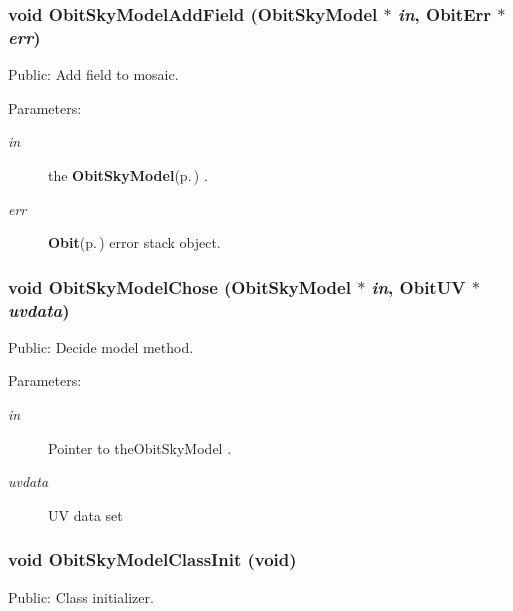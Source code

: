 \subsubsection{\setlength{\rightskip}{0pt plus 5cm}void Obit\-Sky\-Model\-Add\-Field ({\bf Obit\-Sky\-Model} $\ast$ {\em in}, {\bf Obit\-Err} $\ast$ {\em err})}\label{ObitSkyModel_8h_a78}


Public: Add field to mosaic. 

\begin{Desc}
\item[Parameters:]
\begin{description}
\item[{\em in}]the {\bf Obit\-Sky\-Model}{\rm (p.\,\pageref{structObitSkyModel})} . \item[{\em err}]{\bf Obit}{\rm (p.\,\pageref{structObit})} error stack object. \end{description}
\end{Desc}
\subsubsection{\setlength{\rightskip}{0pt plus 5cm}void Obit\-Sky\-Model\-Chose ({\bf Obit\-Sky\-Model} $\ast$ {\em in}, {\bf Obit\-UV} $\ast$ {\em uvdata})}\label{ObitSkyModel_8h_a70}


Public: Decide model method. 

\begin{Desc}
\item[Parameters:]
\begin{description}
\item[{\em in}]Pointer to the\-Obit\-Sky\-Model . \item[{\em uvdata}]UV data set \end{description}
\end{Desc}
\subsubsection{\setlength{\rightskip}{0pt plus 5cm}void Obit\-Sky\-Model\-Class\-Init (void)}\label{ObitSkyModel_8h_a47}


Public: Class initializer. 

